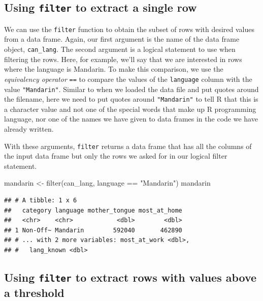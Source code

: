 \documentclass[
]{krantz}
\makeatletter
\newenvironment{Shaded}{\begin{snugshade}}{\end{snugshade}}
\newcommand{\FunctionTok}[1]{\textcolor[rgb]{0,0,0}{#1}}
\newcommand{\NormalTok}[1]{#1}
\newcommand{\OtherTok}[1]{\textcolor[rgb]{0.37,0.37,0.37}{#1}}
\newcommand{\SpecialCharTok}[1]{\textcolor[rgb]{0,0,0}{#1}}
\newcommand{\StringTok}[1]{\textcolor[rgb]{0.5,0.5,0.5}{#1}}
\newenvironment{kframe}{%
\medskip{}
\setlength{\fboxsep}{.8em}
 \def\at@end@of@kframe{}%
 \ifinner\ifhmode%
  \def\at@end@of@kframe{\end{minipage}}%
  \begin{minipage}{\columnwidth}%
 \fi\fi%
 \def\FrameCommand##1{\hskip\@totalleftmargin \hskip-\fboxsep
 \colorbox{shadecolor}{##1}\hskip-\fboxsep
     \hskip-\linewidth \hskip-\@totalleftmargin \hskip\columnwidth}%
 \MakeFramed {\advance\hsize-\width
   \@totalleftmargin\z@ \linewidth\hsize
   \@setminipage}}%
 {\par\unskip\endMakeFramed%
 \at@end@of@kframe}
\renewenvironment{Shaded}{\begin{kframe}}{\end{kframe}}
\makeatother
\begin{document}
\hypertarget{using-filter-to-extract-a-single-row}{%
\subsection{\texorpdfstring{Using \texttt{filter} to extract a single row}{Using filter to extract a single row}}\label{using-filter-to-extract-a-single-row}}

We can use the \texttt{filter} function to obtain the subset of rows with desired values from a data frame. Again, our first argument is the name of the data frame object, \texttt{can\_lang}.
The second argument is a logical statement to use when filtering the rows. Here, for example, we'll say that we are interested in rows where the language is Mandarin. To make
this comparison, we use the \emph{equivalency operator} \texttt{==} to compare the values of the \texttt{language} column with the value \texttt{"Mandarin"}. Similar to when we loaded the data file and put quotes around the filename,
here we need to put quotes around \texttt{"Mandarin"} to tell R that this is a character value and not one of the special words that make up R programming language, nor one of the names
we have given to data frames in the code we have already written.

With these arguments, \texttt{filter} returns a data frame that has all the columns of the input data frame but only the rows we asked for in our logical filter statement.

\begin{Shaded}
\begin{Highlighting}[]
\NormalTok{mandarin }\OtherTok{\textless{}{-}} \FunctionTok{filter}\NormalTok{(can\_lang, language }\SpecialCharTok{==} \StringTok{"Mandarin"}\NormalTok{)}
\NormalTok{mandarin}
\end{Highlighting}
\end{Shaded}

\begin{verbatim}
## # A tibble: 1 x 6
##   category language mother_tongue most_at_home
##   <chr>    <chr>            <dbl>        <dbl>
## 1 Non-Off~ Mandarin        592040       462890
## # ... with 2 more variables: most_at_work <dbl>,
## #   lang_known <dbl>
\end{verbatim}

\hypertarget{using-filter-to-extract-rows-with-values-above-a-threshold}{%
\subsection{\texorpdfstring{Using \texttt{filter} to extract rows with values above a threshold}{Using filter to extract rows with values above a threshold}}\label{using-filter-to-extract-rows-with-values-above-a-threshold}}
\end{document}
